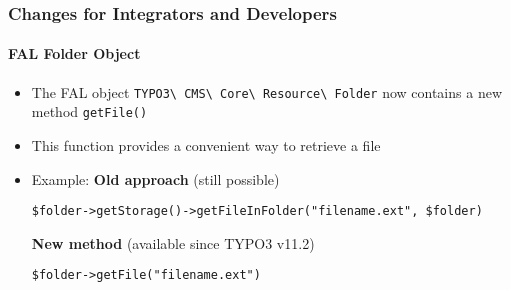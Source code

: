 %

\begin{frame}[fragile]
	\frametitle{Changes for Integrators and Developers}
	\framesubtitle{FAL Folder Object}


	\begin{itemize}
		\item The FAL object
			\small\texttt{TYPO3\textbackslash
				CMS\textbackslash
				Core\textbackslash
				Resource\textbackslash
				Folder}\normalsize\newline
			now contains a new method
			\small\texttt{getFile()}\normalsize

		\item This function provides a convenient way to retrieve a file
		\item Example:\newline
			\small\textbf{Old approach} (still possible)\normalsize
\begin{lstlisting}
$folder->getStorage()->getFileInFolder("filename.ext", $folder)
\end{lstlisting}
			\small\textbf{New method} (available since TYPO3 v11.2)\normalsize
\begin{lstlisting}
$folder->getFile("filename.ext")
\end{lstlisting}

	\end{itemize}
\end{frame}

